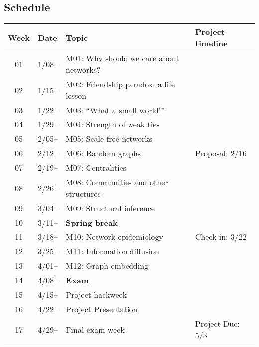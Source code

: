 \subsection{Schedule}\label{sub:schedule}%

\begin{tabular}{@{}clll@{}} \toprule
  Week & Date & Topic & Project timeline\\\midrule
  01 & 1/08-- & M01: Why should we care about networks? & \\
  02 & 1/15-- & M02: Friendship paradox: a life lesson & \\
  03 & 1/22-- & M03: ``What a small world!'' \\
  04 & 1/29-- & M04: Strength of weak ties \\
  05 & 2/05-- & M05: Scale-free networks \\
  06 & 2/12-- & M06: Random graphs & Proposal: 2/16 \\
  07 & 2/19-- & M07: Centralities \\
  08 & 2/26-- & M08: Communities and other structures \\
  09 & 3/04-- & M09: Structural inference \\
  10 & 3/11-- & \textbf{Spring break} \\
  11 & 3/18-- & M10: Network epidemiology & Check-in: 3/22\\
  12 & 3/25-- & M11: Information diffusion \\
  13 & 4/01-- & M12: Graph embedding\\
  14 & 4/08-- & \textbf{Exam} \\
  15 & 4/15-- & Project hackweek \\
  16 & 4/22-- & Project Presentation \\
  17 & 4/29-- & Final exam week & Project Due: 5/3 \\ 
  \bottomrule
\end{tabular}


